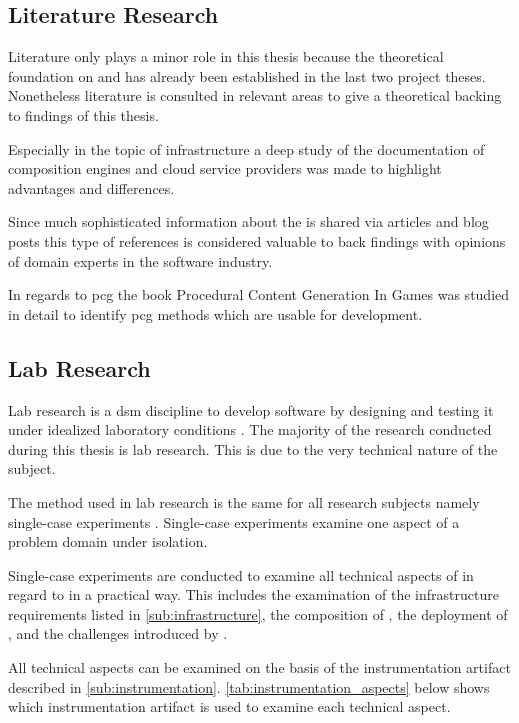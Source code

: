 \subsection{Literature Research}

Literature only plays a minor role in this thesis because the theoretical
foundation on \mss{} and \ogs{} has already been established in the last two
project theses. Nonetheless literature is consulted in relevant areas to give
a theoretical backing to findings of this thesis.

Especially in the topic of \ms{} infrastructure a deep study of the
documentation of composition engines and cloud service providers was made
to highlight advantages and differences.

Since much sophisticated information about the \mss{} is shared via articles
and blog posts this type of references is considered valuable to back findings
with opinions of domain experts in the software industry.

In regards to \gls{pcg} the book Procedural Content Generation In
Games \cite{shaker2014procedural} was studied in detail to identify \gls{pcg}
methods which are usable for \og{} development.

\subsection{Lab Research}
\label{sub:lab_reserach}

Lab research is a \gls{dsm} discipline to develop software by designing and
testing it under idealized laboratory conditions
\cite{wieringa2014design_science}. The majority of the research conducted during
this thesis is lab research. This is due to the very technical nature of the
subject.

The method used in lab research is the same for all research subjects namely
single-case experiments \cite{wieringa2014design_science}. Single-case
experiments examine one aspect of a problem domain under isolation.

Single-case experiments are conducted to examine all technical aspects of \mss{}
in regard to \ogs{} in a practical way. This includes the examination of the
\ms{} infrastructure requirements listed in \autoref{sub:infrastructure}, the
composition of \mss{}, the deployment of \mss{}, and the challenges introduced
by \mss{}.

All technical aspects can be examined on the basis of the instrumentation
artifact described in \autoref{sub:instrumentation}.
\autoref{tab:instrumentation_aspects} below shows which instrumentation artifact
is used to examine each technical aspect.


